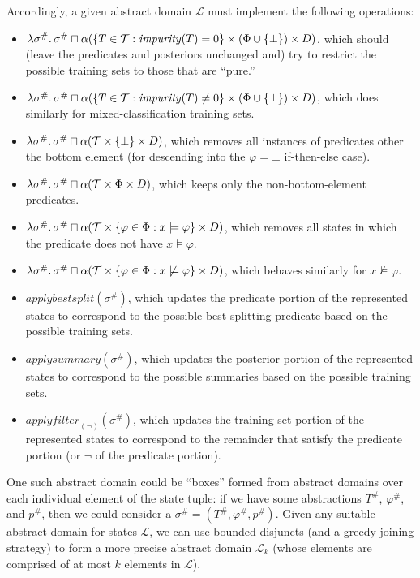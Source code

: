Accordingly, a given abstract domain $\mathcal{L}$ must implement the following operations:
\begin{itemize}
    \item $\lambda \sigma^\# \ldotp \sigma^\# \sqcap
        \alpha(\{T \in \mathcal{T} : \mathit{impurity}(T) = 0\} \times (\Phi \cup \{\bot\}) \times D)$,
        which should (leave the predicates and posteriors unchanged and)
        try to restrict the possible training sets to those that are ``pure.''
    \item $\lambda \sigma^\# \ldotp \sigma^\# \sqcap
        \alpha(\{T \in \mathcal{T} : \mathit{impurity}(T) \neq 0\} \times (\Phi \cup \{\bot\}) \times D)$,
        which does similarly for mixed-classification training sets.
    \item $\lambda \sigma^\# \ldotp \sigma^\# \sqcap
        \alpha(\mathcal{T} \times \{\bot\} \times D)$,
        which removes all instances of predicates other the bottom element
        (for descending into the $\varphi = \bot$ if-then-else case).
    \item $\lambda \sigma^\# \ldotp \sigma^\# \sqcap
        \alpha(\mathcal{T} \times \Phi \times D)$,
        which keeps only the non-bottom-element predicates.
    \item $\lambda \sigma^\# \ldotp \sigma^\# \sqcap
        \alpha(\mathcal{T} \times \{\varphi \in \Phi : x \models \varphi\} \times D)$,
        which removes all states in which the predicate does not have $x \models \varphi$.
    \item $\lambda \sigma^\# \ldotp \sigma^\# \sqcap
        \alpha(\mathcal{T} \times \{\varphi \in \Phi : x \not\models \varphi\} \times D)$,
        which behaves similarly for $x \not\models \varphi$.
    \item $\mathit{applybestsplit}(\sigma^\#)$,
        which updates the predicate portion of the represented states
        to correspond to the possible best-splitting-predicate
        based on the possible training sets.
    \item $\mathit{applysummary}(\sigma^\#)$,
        which updates the posterior portion of the represented states
        to correspond to the possible summaries
        based on the possible training sets.
    \item $\mathit{applyfilter}_{(\lnot)}(\sigma^\#)$,
        which updates the training set portion of the represented states
        to correspond to the remainder that satisfy the predicate portion
        (or $\lnot$ of the predicate portion).
\end{itemize}

One such abstract domain could be ``boxes'' formed from abstract domains
over each individual element of the state tuple:
if we have some abstractions $T^\#$, $\varphi^\#$, and $p^\#$,
then we could consider a $\sigma^\# = (T^\#, \varphi^\#, p^\#)$.
Given any suitable abstract domain for states $\mathcal{L}$,
we can use bounded disjuncts (and a greedy joining strategy)
to form a more precise abstract domain $\mathcal{L}_k$
(whose elements are comprised of at most $k$ elements in $\mathcal{L}$).
